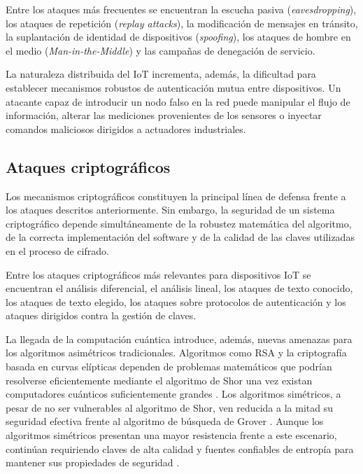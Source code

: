 Entre los ataques más frecuentes se encuentran la escucha pasiva (\textit{eavesdropping}), los ataques de repetición (\textit{replay attacks}), la modificación de mensajes en tránsito, la suplantación de identidad de dispositivos (\textit{spoofing}), los ataques de hombre en el medio (\textit{Man-in-the-Middle}) y las campañas de denegación de servicio.

La naturaleza distribuida del IoT incrementa, además, la dificultad para establecer mecanismos robustos de autenticación mutua entre dispositivos. Un atacante capaz de introducir un nodo falso en la red puede manipular el flujo de información, alterar las mediciones provenientes de los sensores o inyectar comandos maliciosos dirigidos a actuadores industriales.

\subsection{Ataques criptográficos}

Los mecanismos criptográficos constituyen la principal línea de defensa frente a los ataques descritos anteriormente. Sin embargo, la seguridad de un sistema criptográfico depende simultáneamente de la robustez matemática del algoritmo, de la correcta implementación del software y de la calidad de las claves utilizadas en el proceso de cifrado.

Entre los ataques criptográficos más relevantes para dispositivos IoT se encuentran el análisis diferencial, el análisis lineal, los ataques de texto conocido, los ataques de texto elegido, los ataques sobre protocolos de autenticación y los ataques dirigidos contra la gestión de claves.

La llegada de la computación cuántica introduce, además, nuevas amenazas para los algoritmos asimétricos tradicionales. Algoritmos como RSA y la criptografía basada en curvas elípticas dependen de problemas matemáticos que podrían resolverse eficientemente mediante el algoritmo de Shor una vez existan computadores cuánticos suficientemente grandes \cite{Shor1994AlgorithmsFactoring}. Los algoritmos simétricos, a pesar de no ser vulnerables al algoritmo de Shor, ven reducida a la mitad su seguridad efectiva frente al algoritmo de búsqueda de Grover \cite{Grover1996ASearch}. Aunque los algoritmos simétricos presentan una mayor resistencia frente a este escenario, continúan requiriendo claves de alta calidad y fuentes confiables de entropía para mantener sus propiedades de seguridad \cite{Turan2018RecommendationGeneration}.

